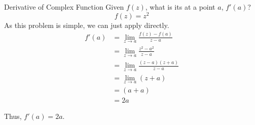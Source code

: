 \begin{example}[Lecture 5]{Derivative of Complex Function}
  Given $f(z)$, what is its  at a point $a$, $f'(a)$?
  \begin{equation*}
    f(z) = z^{2}
  \end{equation*}
  \tcblower{}
  As this problem is simple, we can just apply  directly.
  \begin{align*}
    f'(a) &= \lim\limits_{z \to a} \frac{f(z) - f(a)}{z - a} \\
          &= \lim\limits_{z \to a} \frac{z^{2} - a^{2}}{z - a} \\
          &= \lim\limits_{z \to a} \frac{(z-a) (z+a)}{z - a} \\
          &= \lim\limits_{z \to a} (z+a) \\
          &= (a + a) \\
          &= 2a
  \end{align*}

  Thus, $f'(a) = 2a$.
\end{example}

